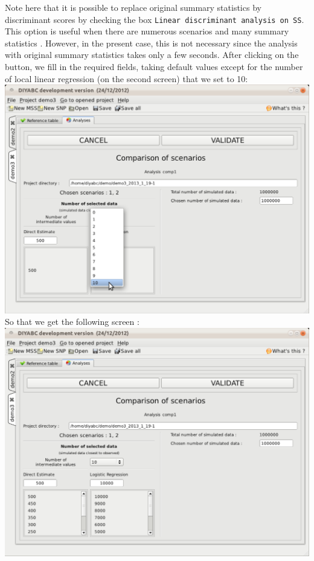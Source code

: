 Note here that it is possible to replace original summary statistics by discriminant scores by checking the box \texttt{Linear discriminant analysis on SS}. This option is useful when there are numerous scenarios and many summary statistics \citep{EL2012}. However, in the present case, this is not necessary since the analysis with original summary statistics takes only a few seconds. After clicking on the  button, we fill in the required fields, taking default values except for the number of local linear regression (on the second screen) that we set to 10:\\

\includegraphics[scale=0.38]{gui_pictures/Capture-DIYABC-109.png} \\

So that we get the following screen :\\

\includegraphics[scale=0.38]{gui_pictures/Capture-DIYABC-110.png} \\

